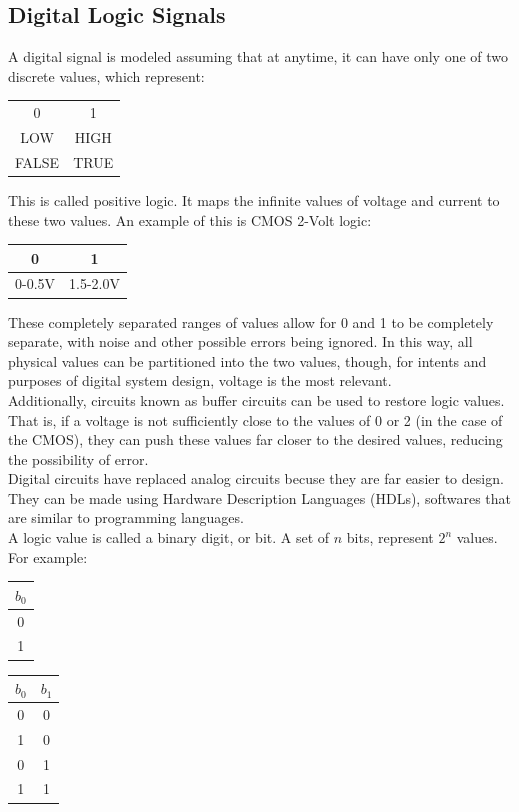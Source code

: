 \documentclass[nobib]{tufte-handout}
\begin{document}
\subsection{Digital Logic Signals}
A digital signal is modeled assuming that at anytime, it can have only one of
two discrete values, which represent:\\
\begin{table}
    \centering
    \begin{tabular}{c|c}
        0     & 1    \\
        LOW   & HIGH \\
        FALSE & TRUE \\
    \end{tabular}
\end{table}
This is called positive logic.
It maps the infinite values of voltage and current to these two values.
An example of this is CMOS 2-Volt logic:\\
\begin{table}
    \centering
    \begin{tabular}{c|c}
        0      & 1        \\
        \hline
        0-0.5V & 1.5-2.0V \\
    \end{tabular}
\end{table}
These completely separated ranges of values allow for 0 and 1 to be completely separate, with noise and other possible errors being ignored. In this way, all physical values can be partitioned into the two values, though, for intents and purposes of digital system design, voltage is the most relevant.\\
Additionally, circuits known as buffer circuits can be used to restore logic values. That is, if a voltage is not sufficiently close to the values of 0 or 2 (in the case of the CMOS), they can push these values far closer to the desired values, reducing the possibility of error.\\
Digital circuits have replaced analog circuits becuse they are far easier to design. They can be made using Hardware Description Languages (HDLs), softwares that are similar to programming languages.\\
A logic value is called a binary digit, or bit. A set of $n$ bits, represent $2^n$ values. For example:
\begin{table}
    \centering
    \begin{tabular}{c}
        $b_0$ \\
        \hline
        0     \\
        1     \\
    \end{tabular}
    \quad
    \begin{tabular}{c c}
        $b_0$ & $b_1$ \\
        \hline
        0     & 0     \\
        1     & 0     \\
        0     & 1     \\
        1     & 1
    \end{tabular}
\end{table}
\end{document}
